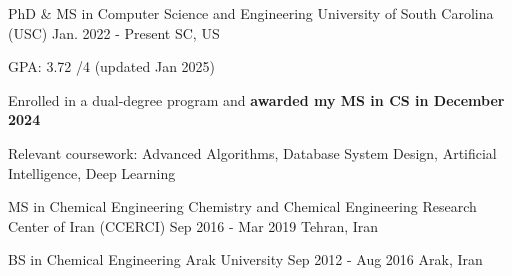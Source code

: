 {}


\begin{cventries}

  \cventry
    {PhD \& MS in Computer Science and Engineering}   %
    {University of South Carolina (USC)}        %
    {Jan. 2022 - Present}                      %
    {SC, US}                                   %
    {
      \begin{cvitems}                           %
        \item {GPA: 3.72 /4 (updated Jan 2025)}
        \item {Enrolled in a dual-degree program and \textbf{awarded my MS in CS in December 2024}}
        \item {Relevant coursework: Advanced Algorithms, Database System Design, Artificial Intelligence, Deep Learning}
      \end{cvitems}
    }

\vspace{0.07cm}
\cventry
    {MS in Chemical Engineering}
    {Chemistry and Chemical Engineering Research Center of Iran (CCERCI)}
    {Sep 2016 - Mar 2019}
    {Tehran, Iran}
    {
    }

\vspace{-0.35cm}
\cventry
    {BS in Chemical Engineering}
    {Arak University}
    {Sep 2012 - Aug 2016}
    {Arak, Iran}
    {
    }

\end{cventries}
